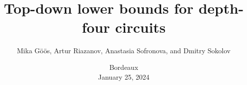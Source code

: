

\titlegraphic{
    
}


\title[]{
    Top-down lower bounds for depth-four circuits
}

\author{
    Mika G{\"{o}}{\"{o}}s, Artur Riazanov, Anastasia Sofronova, and Dmitry Sokolov
}  


\date{
    Bordeaux\\
    January 25, 2024
}






    \maketitle

    
    
    

